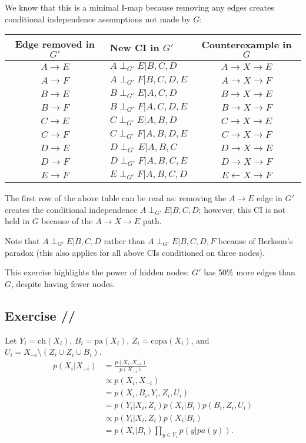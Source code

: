 \documentclass[a4paper,11pt]{article}
\newcounter{exercise}
\newcounter{subexercise}
\newcommand*{\exercise}[1][]{\subsection*{Exercise \ifx/#1/\stepcounter{exercise}\arabic{exercise}\else#1\fi}\setcounter{subexercise}{0}}
\begin{document}
We know that this is a minimal I-map because removing any edges creates conditional
independence assumptions not made by $G$:
\begin{center}
    \begin{tabular}{c|l|c} 
        Edge removed in $G'$ & New CI in $G'$ & Counterexample in $G$\\
         \hline
         $A\rightarrow E$ & $A \perp_{G'} E | B, C, D$ & $ A\rightarrow X \rightarrow E$ \\
         $A\rightarrow F$ & $A \perp_{G'} F | B, C, D, E$ & $A \rightarrow  X\rightarrow F$ \\
         $B\rightarrow E$ & $B \perp_{G'} E | A, C, D$ & $ B \rightarrow X \rightarrow E$ \\
         $B\rightarrow F$ & $B \perp_{G'} F | A, C, D, E$ & $ B\rightarrow X \rightarrow F$ \\
         $C\rightarrow E$ & $C \perp_{G'} E | A, B, D$ & $C \rightarrow X \rightarrow E$ \\
         $C\rightarrow F$ & $C \perp_{G'} F | A, B, D, E$ & $C \rightarrow  X\rightarrow F$ \\
         $D\rightarrow E$ & $D \perp_{G'} E | A, B, C$ & $D \rightarrow X \rightarrow E$ \\
         $D\rightarrow F$ & $D \perp_{G'} F | A, B, C, E$ & $D \rightarrow  X\rightarrow F$ \\
         $E\rightarrow F$ & $E \perp_{G'} F | A, B, C,D$ & $E \leftarrow X\rightarrow F$ \\
    \end{tabular}
\end{center}

The first row of the above table can be read as: removing the $A\rightarrow E$ edge in
$G'$ creates the conditional independence $A \perp_{G'} E | B, C, D$; however, this CI
is not held in $G$ because of the $A \rightarrow X \rightarrow E$ path.

Note that $A \perp_{G'} E | B, C, D$ rather than $A \perp_{G'} E | B, C, D, F$ because of
Berkson's paradox (this also applies for all above CIs conditioned on three nodes).

This exercise highlights the power of hidden nodes: $G'$ has 50\% more edges
than $G$, despite having fewer nodes.

\setcounter{exercise}{2}
\exercise
Let $Y_i = \text{ch}( X_i )$, $B_i = \text{pa}( X_i )$, $Z_i = \text{copa}( X_i )$,
and $U_i = X_{-i} \setminus ( Z_i \cup Z_i \cup B_i )$.
\begin{align*}
    p( X_i | X_{-i} ) &= \frac{ p( X_i, X_{-i} )}{ p( X_{-i} )} \\
    &\propto p( X_i, X_{-i} ) \\
    &= p( X_i, B_i, Y_i, Z_i, U_i ) \\
    &= p( Y_i | X_i, Z_i ) p( X_i|B_i ) p( B_i, Z_i, U_i ) \\
    &\propto p( Y_i | X_i, Z_i ) p( X_i | B_i ) \\
    &= p( X_i | B_i ) \prod\limits_{ y\in Y_i } p( y | pa(y) ).
\end{align*}
\end{document}
